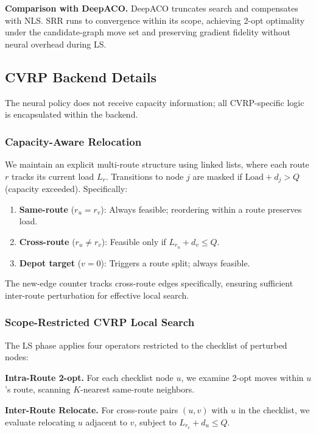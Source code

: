 \documentclass[sigconf,review]{acmart}
\begin{document}
\textbf{Comparison with DeepACO.}
DeepACO truncates search and compensates with NLS.
SRR runs to convergence within its scope, achieving 2-opt optimality under the candidate-graph move set and preserving gradient fidelity without neural overhead during LS.

\subsection{CVRP Backend Details}
\label{app:cvrp}

The neural policy does not receive capacity information; all CVRP-specific logic is encapsulated within the backend.

\subsubsection{Capacity-Aware Relocation}
We maintain an explicit multi-route structure using linked lists, where each route $r$ tracks its current load $L_r$.
Transitions to node $j$ are masked if $\text{Load} + d_j > Q$ (capacity exceeded).
Specifically:
\begin{enumerate}
    \item \textbf{Same-route} ($r_u = r_v$): Always feasible; reordering within a route preserves load.
    \item \textbf{Cross-route} ($r_u \neq r_v$): Feasible only if $L_{r_u} + d_v \leq Q$.
    \item \textbf{Depot target} ($v = 0$): Triggers a route split; always feasible.
\end{enumerate}
The new-edge counter tracks cross-route edges specifically, ensuring sufficient inter-route perturbation for effective local search.

\subsubsection{Scope-Restricted CVRP Local Search}
The LS phase applies four operators restricted to the checklist of perturbed nodes:

\textbf{Intra-Route 2-opt.}
For each checklist node $u$, we examine 2-opt moves within $u$'s route, scanning $K$-nearest same-route neighbors.

\textbf{Inter-Route Relocate.}
For cross-route pairs $(u, v)$ with $u$ in the checklist, we evaluate relocating $u$ adjacent to $v$, subject to $L_{r_v} + d_u \leq Q$.
\end{document}
